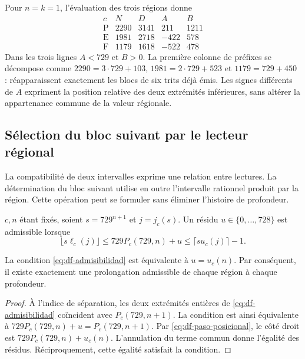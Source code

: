 \begin{example}
Pour \(n=k=1\), l'évaluation des trois régions donne
\[
\begin{array}{c|rr|rr}
 c&N&D&A&B\\\hline
 \mathrm P&2290&3141&211&1211\\
 \mathrm E&1981&2718&-422&578\\
 \mathrm F&1179&1618&-522&478
\end{array}
\]
Dans les trois lignes \(A<729\) et \(B>0\). La première colonne de préfixes
se décompose comme \(2290=3\cdot729+103\),
\(1981=2\cdot729+523\) et \(1179=729+450\) : réapparaissent exactement les
blocs de six trits déjà émis. Les signes différents de \(A\) expriment
la position relative des deux extrémités inférieures, sans altérer la
appartenance commune de la valeur régionale.
\end{example}

\subsection{Sélection du bloc suivant par le lecteur régional}

La compatibilité de deux intervalles exprime une relation entre lectures. La détermination du bloc suivant utilise en outre l'intervalle rationnel produit par la région. Cette opération peut se formuler sans éliminer l'histoire de profondeur.

\begin{definition}
\(c,n\) étant fixés, soient \(s=729^{n+1}\) et \(j=j_c(s)\). Un résidu
\(u\in\{0,\ldots,728\}\) est admissible lorsque
\begin{equation}
 \lfloor s\ell_c(j)\rfloor
 \leq729P_c(729,n)+u
 \leq\lceil su_c(j)\rceil-1.
 \label{eq:df-admisibilidad}
\end{equation}
\end{definition}

\begin{theorem}
\label{thm:df-prolongacion-unica}
La condition \eqref{eq:df-admisibilidad} est équivalente à \(u=u_c(n)\).
Par conséquent, il existe exactement une prolongation admissible de chaque région
à chaque profondeur.
\end{theorem}

\begin{proof}
À l'indice de séparation, les deux extrémités entières de
\eqref{eq:df-admisibilidad} coïncident avec \(P_c(729,n+1)\).
La condition est ainsi équivalente à
\(729P_c(729,n)+u=P_c(729,n+1)\).
Par \eqref{eq:df-paso-posicional}, le côté droit est
\(729P_c(729,n)+u_c(n)\). L'annulation du terme commun donne l'égalité des résidus. Réciproquement, cette égalité satisfait la condition.
\end{proof}


